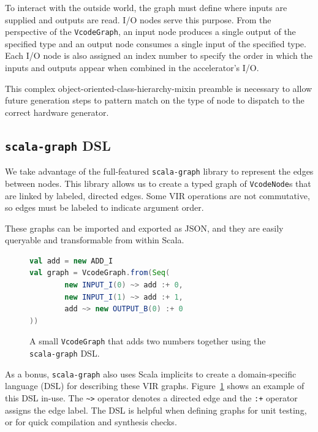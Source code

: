 \documentclass[sigconf, nonacm]{acmart}
\begin{document}
To interact with the outside world, the graph must define where inputs are supplied and outputs are read.
I/O nodes serve this purpose.
From the perspective of the \texttt{VcodeGraph}, an input node produces a single output of the specified type and an output node consumes a single input of the specified type.
Each I/O node is also assigned an index number to specify the order in which the inputs and outputs appear when combined in the accelerator's I/O.

This complex object-oriented-class-hierarchy-mixin preamble is necessary to allow future generation steps to pattern match on the type of node to dispatch to the correct hardware generator.

\subsection{\texttt{scala-graph} DSL}

We take advantage of the full-featured \texttt{scala-graph} library \cite{scala-graph} to represent the edges between nodes.
This library allows us to create a typed graph of \texttt{VcodeNode}s that are linked by labeled, directed edges.
Some VIR operations are not commutative, so edges must be labeled to indicate argument order.

These graphs can be imported and exported as JSON, and they are easily queryable and transformable from within Scala.

\begin{figure}
	\begin{center}
		\begin{lstlisting}[language=scala]
val add = new ADD_I
val graph = VcodeGraph.from(Seq(
		new INPUT_I(0) ~> add :+ 0,
		new INPUT_I(1) ~> add :+ 1,
		add ~> new OUTPUT_B(0) :+ 0
))
		\end{lstlisting}
	\end{center}
	\caption{A small \texttt{VcodeGraph} that adds two numbers together using the \texttt{scala-graph} DSL.}
	\label{fig:village-graph-def}
\end{figure}

As a bonus, \texttt{scala-graph} also uses Scala implicits to create a domain-specific language (DSL) for describing these VIR graphs.
Figure~\ref{fig:village-graph-def} shows an example of this DSL in-use.
The \texttt{\textasciitilde>} operator denotes a directed edge and the \texttt{:+} operator assigns the edge label.
The DSL is helpful when defining graphs for unit testing, or for quick compilation and synthesis checks.
\end{document}
